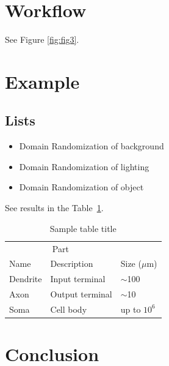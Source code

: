 \documentclass{article}
\begin{document}
\section{Workflow}
\label{sec:workflow}
See Figure \ref{fig:fig3}.

\section{Example}
\label{sec:example}

\subsection{Lists}
\begin{itemize}
	\item Domain Randomization of background
	\item Domain Randomization of lighting
	\item Domain Randomization of object
\end{itemize}

See results in the Table~\ref{tab:table}.

\begin{table}
	\caption{Sample table title}
	\centering
	\begin{tabular}{lll}
		\toprule
		\multicolumn{2}{c}{Part}                   \\
		\cmidrule(r){1-2}
		Name     & Description     & Size ($\mu$m) \\
		\midrule
		Dendrite & Input terminal  & $\sim$100     \\
		Axon     & Output terminal & $\sim$10      \\
		Soma     & Cell body       & up to $10^6$  \\
		\bottomrule
	\end{tabular}
	\label{tab:table}
\end{table}

\section{Conclusion}
\label{sec:conclusion}
\lipsum[2]



\end{document}
